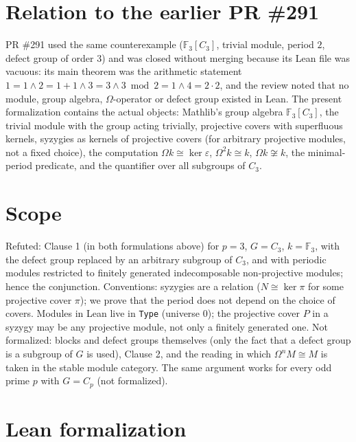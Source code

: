 \documentclass[11pt]{article}
\renewcommand{\_}{\oldus\allowbreak}
\theoremstyle{definition}
\theoremstyle{remark}
\begin{document}
\section{Relation to the earlier PR \#291}

PR \#291 used the same counterexample ($\mathbb{F}_3[C_3]$, trivial module, period $2$, defect
group of order $3$) and was closed without merging because its Lean file was vacuous: its main
theorem was the arithmetic statement $1=1\wedge 2=1+1\wedge 3=3\wedge 3\bmod 2=1\wedge 4=2\cdot2$, and
the review noted that no module, group algebra, $\Omega$-operator or defect group existed in Lean.
The present formalization contains the actual objects: Mathlib's group algebra
$\mathbb{F}_3[C_3]$, the trivial module with the group acting trivially, projective covers with
superfluous kernels, syzygies as kernels of projective covers (for arbitrary projective modules, not a
fixed choice), the computation $\Omega k\cong\ker\varepsilon$, $\Omega^2k\cong k$, $\Omega k\not\cong k$,
the minimal-period predicate, and the quantifier over all subgroups of $C_3$.

\section{Scope}

Refuted: Clause 1 (in both formulations above) for $p=3$, $G=C_3$, $k=\mathbb{F}_3$, with the
defect group replaced by an arbitrary subgroup of $C_3$, and with periodic modules restricted to
finitely generated indecomposable non-projective modules; hence the conjunction. Conventions:
syzygies are a relation ($N\cong\ker\pi$ for some projective cover $\pi$); we prove that the period
does not depend on the choice of covers. Modules in Lean live in \texttt{Type} (universe 0); the
projective cover $P$ in a syzygy may be any projective module, not only a finitely generated one.
Not formalized: blocks and defect groups themselves (only the fact that a defect group is a
subgroup of $G$ is used), Clause 2, and the reading in which $\Omega^nM\cong M$ is taken in the stable
module category. The same argument works for every odd prime $p$ with $G=C_p$ (not formalized).

\section{Lean formalization}
\end{document}

